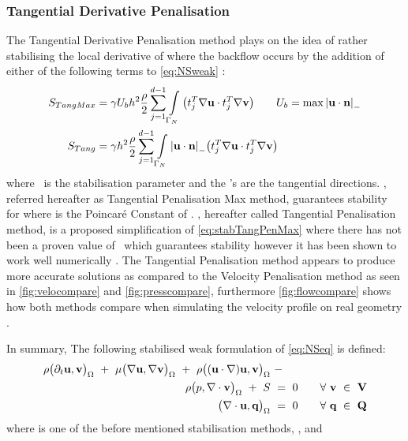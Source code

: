 \subsubsection{Tangential Derivative Penalisation}
The Tangential Derivative Penalisation method plays on the idea of rather stabilising the local derivative of where the backflow occurs by the addition of either of the following terms to \autoref{eq:NSweak} \cite[Slide 21]{bertoglioLec12}:%
\begin{align}
S_{TangMax} &= \gamma U_b h^2 \frac{\rho}{2} \sum_{j=1}^{d-1}\int\limits_{\Gamma_{N}} \qty(t_j^{T}\nabla{\textbf{u}} \cdot t_j^{T}\nabla{\textbf{v}}) \qquad U_b = \max \abs{{\textbf{u}} \cdot {\textbf{n}}}_-\label{eq:stabTangPenMax}\\
    S_{Tang} &= \gamma h^2 \frac{\rho}{2} \sum_{j=1}^{d-1}\int\limits_{\Gamma_{N}}\abs{{\textbf{u}} \cdot {\textbf{n}}}_{-}\qty(t_j^{T}\nabla{\textbf{u}} \cdot t_j^{T}\nabla{\textbf{v}})\label{eq:stabTangPen}
\end{align}
where \mgamma~is the stabilisation parameter and the 's are the tangential directions. , referred hereafter as Tangential Penalisation Max method, guarantees stability for  where  is the Poincar\'e Constant of  \cite{bertoglio2016}. , hereafter called Tangential Penalisation method, is a proposed simplification of \eqref{eq:stabTangPenMax} where there has not been a proven value of \mgamma~which guarantees stability however it has been shown to work well numerically \cite[Slide 25]{bertoglioLec12}\cite{bertoglio2014}. The Tangential Penalisation method appears to produce more accurate solutions as compared to the Velocity Penalisation method as seen in \autoref{fig:velocompare} and \autoref{fig:presscompare}, furthermore \autoref{fig:flowcompare} shows how both methods compare when simulating the velocity profile on real geometry \cite{bertoglio2017}.


In summary, The following stabilised weak formulation of \eqref{eq:NSeq} is defined:
\begin{align}\label{eq:NSweakstab}
\begin{split}
    \rho\big(\partial_t{\textbf{u}},{\textbf{v}}\big)_{\Omega} ~+~
    \mu\big(\nabla{\textbf{u}},\nabla{\textbf{v}}\big)_{\Omega} ~+~
    \rho\big(\qty({\textbf{u}}\cdot\nabla){\textbf{u}},{\textbf{v}}\big)_{\Omega} ~&-~\\
    \rho\big(p,\nabla\cdot{\textbf{v}}\big)_{\Omega} ~+~ S ~&=~ 0 \qquad \forall~{\textbf{v}}~\in~\mathbf{V}\\
    \big(\nabla\cdot{\textbf{u}},\textbf{q}\big)_{\Omega} ~&=~ 0 \qquad \forall~\textbf{q}~\in~\mathbf{Q}
\end{split}
\end{align}
where  is one of the before mentioned stabilisation methods, ,  and 


